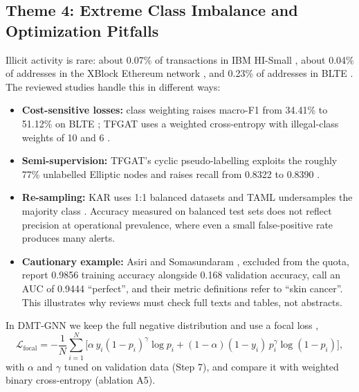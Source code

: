 \documentclass[11pt,a4paper]{article}
\begin{document}
\subsection{Theme 4: Extreme Class Imbalance and Optimization Pitfalls}
Illicit activity is rare: about 0.07\% of transactions in IBM HI-Small \cite{egressy2024multigraph}, about 0.04\% of addresses in the XBlock Ethereum network \cite{tian2025kar}, and 0.23\% of addresses in BLTE \cite{alemari2026explainable}. The reviewed studies handle this in different ways:
\begin{itemize}[leftmargin=*]
    \item \textbf{Cost-sensitive losses:} class weighting raises macro-F1 from 34.41\% to 51.12\% on BLTE \cite{alemari2026explainable}; TFGAT uses a weighted cross-entropy with illegal-class weights of 10 and 6 \cite{li2025tfgat}.
    \item \textbf{Semi-supervision:} TFGAT's cyclic pseudo-labelling exploits the roughly 77\% unlabelled Elliptic nodes and raises recall from 0.8322 to 0.8390 \cite{li2025tfgat}.
    \item \textbf{Re-sampling:} KAR uses 1:1 balanced datasets \cite{tian2025kar} and TAML undersamples the majority class \cite{rico2026taml}. Accuracy measured on balanced test sets does not reflect precision at operational prevalence, where even a small false-positive rate produces many alerts.
    \item \textbf{Cautionary example:} Asiri and Somasundaram \cite{asiri2025gcn}, excluded from the quota, report 0.9856 training accuracy alongside 0.168 validation accuracy, call an AUC of 0.9444 ``perfect'', and their metric definitions refer to ``skin cancer''. This illustrates why reviews must check full texts and tables, not abstracts.
\end{itemize}

In DMT-GNN we keep the full negative distribution and use a focal loss \cite{lin2017focal},
\begin{equation}
    \mathcal{L}_{\text{focal}} = -\frac{1}{N}\sum_{i=1}^{N}\Big[\alpha\, y_i (1-p_i)^{\gamma}\log p_i + (1-\alpha)(1-y_i)\, p_i^{\gamma}\log(1-p_i)\Big],
\end{equation}
with $\alpha$ and $\gamma$ tuned on validation data (Step 7), and compare it with weighted binary cross-entropy (ablation A5).
\end{document}

